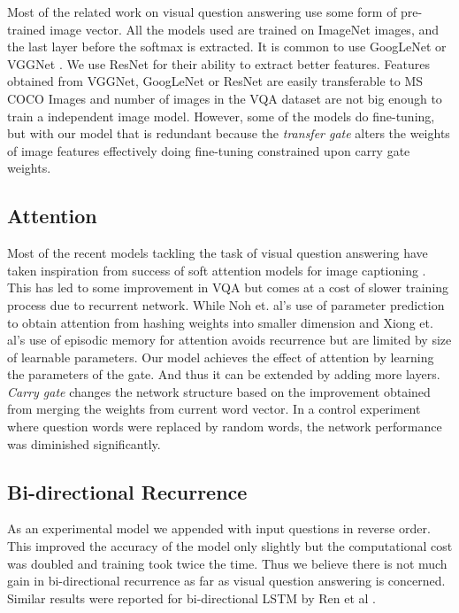 Most of the related work on visual question answering use some form of pre-trained image vector. All the models used are trained on ImageNet images, and the last layer before the softmax is extracted. It is common to use GoogLeNet \cite{jiang2015compositional} \cite{xu2015ask} \cite{zhou2015simple} \cite{wu2016image} or VGGNet \cite{wu2015ask}  \cite{xiong2016dynamic}  \cite{yang2015stacked}   \cite{shih2015look} \cite{ren2015exploring} \cite{andreas2016learning} \cite{Lu2015}\cite{zhu2015visual7w} \cite{noh2015image}. We use ResNet\cite{he2015deep} for their ability to extract better features. Features obtained from VGGNet, GoogLeNet or ResNet are easily transferable to MS COCO Images and  number of images in the VQA dataset are not big enough to train a independent image model. However, some of the models do fine-tuning\cite{noh2015image}, but with our model that is redundant because the \textit{transfer gate} alters the weights of image features effectively doing fine-tuning constrained upon {carry gate} weights.

\subsection{Attention}
Most of the recent models \cite{xiong2016dynamic} \cite{xu2015ask} \cite{yang2015stacked} tackling the task of visual question answering have taken inspiration from success of soft attention models for image captioning\cite{karpathy2015deep} \cite{xu2015show}. This has led to some improvement in VQA but comes at a cost of slower training process due to recurrent network. While Noh et. al's \cite{noh2015image} use of parameter prediction to obtain attention from hashing weights into smaller dimension and Xiong et. al's\cite{xiong2016dynamic} use of episodic memory for attention avoids recurrence but are limited by size of learnable parameters. Our model achieves the effect of attention by learning the parameters of the gate. And thus it can be extended by adding more layers. \textit{Carry gate} changes the network structure based on the improvement obtained from merging the weights from current word vector.  In a control experiment where question words were replaced by random words, the network performance was diminished significantly.

\subsection{Bi-directional Recurrence}
As an experimental model we appended with input questions in reverse order. This improved the accuracy of the model only slightly but the computational cost was doubled and training took twice the time. Thus we believe there is not much gain in bi-directional recurrence as far as visual question answering is concerned. Similar results were reported for bi-directional LSTM by Ren et al \cite{ren2015exploring}.

